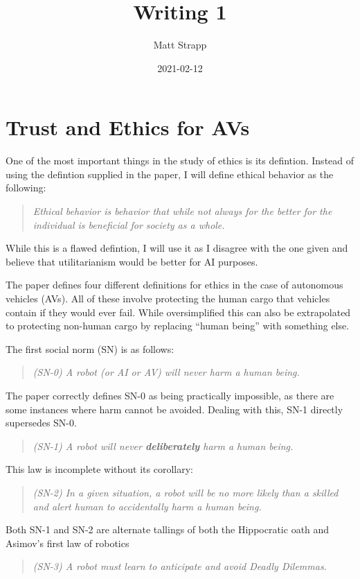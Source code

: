 \documentclass{article}
\title{Writing 1}
\author{Matt Strapp}
\date{2021-02-12}
\begin{document}
   \maketitle
   \section*{Trust and Ethics for AVs}
   One of the most important things in the study of ethics is its defintion.
   Instead of using the defintion supplied in the paper, I will define ethical behavior as the following:   
   \begin{quote}
      \emph{Ethical behavior is behavior that while not always for the better for the individual is beneficial for society as a whole.}
   \end{quote}
   While this is a flawed defintion, I will use it as I disagree with the one given and believe that utilitarianism would be better for AI purposes.


   The paper defines four different definitions for ethics in the case of autonomous vehicles (AVs).
   All of these involve protecting the human cargo that vehicles contain if they would ever fail.
   While oversimplified this can also be extrapolated to protecting non-human cargo by replacing ``human being'' with something else.

   The first social norm (SN) is as follows:
   \begin{quote}
      \emph{(SN-0) A robot (or AI or AV) will never harm a human being.}
   \end{quote}
   The paper correctly defines SN-0 as being practically impossible, as there are some instances where harm cannot be avoided.
   Dealing with this, SN-1 directly supersedes SN-0.
   \begin{quote}
      \emph{(SN-1) A robot will never \textbf{deliberately} harm a human being.}
   \end{quote}
   This law is incomplete without its corollary:
   \begin{quote}
      \emph{(SN-2) In a given situation, a robot will be no more likely than a skilled and alert human to accidentally harm a human being.}
   \end{quote}
   Both SN-1 and SN-2 are alternate tallings of both the Hippocratic oath and Asimov's first law of robotics
   \begin{quote}
      \emph{(SN-3) A robot must learn to anticipate and avoid Deadly Dilemmas.}
   \end{quote}
    
\end{document}
